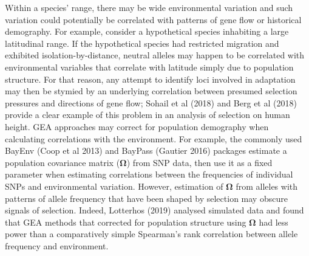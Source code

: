 \documentclass[11pt,twoside,lineno]{GSA_format}
\begin{document}
Within a species' range, there may be wide environmental variation and such variation could potentially be correlated with patterns of gene flow or historical demography. For example, consider a hypothetical species inhabiting a large latitudinal range. If the hypothetical species had restricted migration and exhibited isolation-by-distance, neutral alleles may happen to be correlated with environmental variables that correlate with latitude simply due to population structure. For that reason, any attempt to identify loci involved in adaptation may then be stymied by an underlying correlation between presumed selection pressures and directions of gene flow; Sohail et al (2018) and Berg et al (2018) provide a clear example of this problem in an analysis of selection on human height. GEA approaches may correct for population demography when calculating correlations with the environment. For example, the commonly used BayEnv (Coop et al 2013) and BayPass (Gautier 2016) packages estimate a population covariance matrix (\textbf{$\mathbf{\Omega}$}) from SNP data, then use it as a fixed parameter when estimating correlations between the frequencies of individual SNPs and environmental variation. However, estimation of \textbf{$\mathbf{\Omega}$} from alleles with patterns of allele frequency that have been shaped by selection may obscure signals of selection. Indeed, Lotterhos (2019) analysed simulated data and found that GEA methods that corrected for population structure using \textbf{$\mathbf{\Omega}$} had less power than a comparatively simple Spearman's rank correlation between allele frequency and environment. \\
\end{document}
